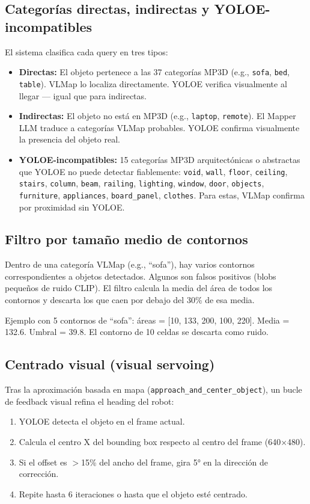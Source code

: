 \documentclass[11pt,a4paper]{article}
\begin{document}
\subsection{Categorías directas, indirectas y YOLOE-incompatibles}

El sistema clasifica cada query en tres tipos:
\begin{itemize}
    \item \textbf{Directas:} El objeto pertenece a las 37 categorías MP3D (e.g., \texttt{sofa}, \texttt{bed}, \texttt{table}). VLMap lo localiza directamente. YOLOE verifica visualmente al llegar --- igual que para indirectas.
    \item \textbf{Indirectas:} El objeto no está en MP3D (e.g., \texttt{laptop}, \texttt{remote}). El Mapper LLM traduce a categorías VLMap probables. YOLOE confirma visualmente la presencia del objeto real.
    \item \textbf{YOLOE-incompatibles:} 15 categorías MP3D arquitectónicas o abstractas que YOLOE no puede detectar fiablemente: \texttt{void}, \texttt{wall}, \texttt{floor}, \texttt{ceiling}, \texttt{stairs}, \texttt{column}, \texttt{beam}, \texttt{railing}, \texttt{lighting}, \texttt{window}, \texttt{door}, \texttt{objects}, \texttt{furniture}, \texttt{appliances}, \texttt{board\_panel}, \texttt{clothes}. Para estas, VLMap confirma por proximidad sin YOLOE.
\end{itemize}

\subsection{Filtro por tamaño medio de contornos}

Dentro de una categoría VLMap (e.g., ``sofa''), hay varios contornos correspondientes a objetos detectados. Algunos son falsos positivos (blobs pequeños de ruido CLIP). El filtro calcula la media del área de todos los contornos y descarta los que caen por debajo del 30\% de esa media.

Ejemplo con 5 contornos de ``sofa'': áreas = [10, 133, 200, 100, 220]. Media = 132.6. Umbral = 39.8. El contorno de 10 celdas se descarta como ruido.

\subsection{Centrado visual (visual servoing)}

Tras la aproximación basada en mapa (\texttt{approach\_and\_center\_object}), un bucle de feedback visual refina el heading del robot:
\begin{enumerate}
    \item YOLOE detecta el objeto en el frame actual.
    \item Calcula el centro X del bounding box respecto al centro del frame (640$\times$480).
    \item Si el offset es $>$15\% del ancho del frame, gira 5° en la dirección de corrección.
    \item Repite hasta 6 iteraciones o hasta que el objeto esté centrado.
\end{enumerate}
\end{document}

